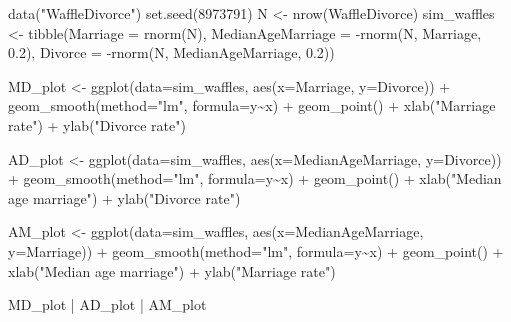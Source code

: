 \documentclass[
]{book}
\newenvironment{Shaded}{\begin{snugshade}}{\end{snugshade}}
\newcommand{\AttributeTok}[1]{\textcolor[rgb]{0.77,0.63,0.00}{#1}}
\newcommand{\DecValTok}[1]{\textcolor[rgb]{0.00,0.00,0.81}{#1}}
\newcommand{\FloatTok}[1]{\textcolor[rgb]{0.00,0.00,0.81}{#1}}
\newcommand{\FunctionTok}[1]{\textcolor[rgb]{0.00,0.00,0.00}{#1}}
\newcommand{\NormalTok}[1]{#1}
\newcommand{\OtherTok}[1]{\textcolor[rgb]{0.56,0.35,0.01}{#1}}
\newcommand{\SpecialCharTok}[1]{\textcolor[rgb]{0.00,0.00,0.00}{#1}}
\newcommand{\StringTok}[1]{\textcolor[rgb]{0.31,0.60,0.02}{#1}}
\begin{document}
\begin{Shaded}
\begin{Highlighting}[]
\FunctionTok{data}\NormalTok{(}\StringTok{"WaffleDivorce"}\NormalTok{)}
\FunctionTok{set.seed}\NormalTok{(}\DecValTok{8973791}\NormalTok{)}
\NormalTok{N }\OtherTok{\textless{}{-}} \FunctionTok{nrow}\NormalTok{(WaffleDivorce)}
\NormalTok{sim\_waffles }\OtherTok{\textless{}{-}} \FunctionTok{tibble}\NormalTok{(}\AttributeTok{Marriage =} \FunctionTok{rnorm}\NormalTok{(N),}
                      \AttributeTok{MedianAgeMarriage =} \SpecialCharTok{{-}}\FunctionTok{rnorm}\NormalTok{(N, Marriage, }\FloatTok{0.2}\NormalTok{),}
                      \AttributeTok{Divorce =} \SpecialCharTok{{-}}\FunctionTok{rnorm}\NormalTok{(N, MedianAgeMarriage, }\FloatTok{0.2}\NormalTok{))}

\NormalTok{MD\_plot }\OtherTok{\textless{}{-}} 
  \FunctionTok{ggplot}\NormalTok{(}\AttributeTok{data=}\NormalTok{sim\_waffles, }\FunctionTok{aes}\NormalTok{(}\AttributeTok{x=}\NormalTok{Marriage, }\AttributeTok{y=}\NormalTok{Divorce)) }\SpecialCharTok{+} 
  \FunctionTok{geom\_smooth}\NormalTok{(}\AttributeTok{method=}\StringTok{"lm"}\NormalTok{, }\AttributeTok{formula=}\NormalTok{y}\SpecialCharTok{\textasciitilde{}}\NormalTok{x) }\SpecialCharTok{+} 
  \FunctionTok{geom\_point}\NormalTok{() }\SpecialCharTok{+} 
  \FunctionTok{xlab}\NormalTok{(}\StringTok{"Marriage rate"}\NormalTok{) }\SpecialCharTok{+} 
  \FunctionTok{ylab}\NormalTok{(}\StringTok{"Divorce rate"}\NormalTok{)}

\NormalTok{AD\_plot }\OtherTok{\textless{}{-}} 
  \FunctionTok{ggplot}\NormalTok{(}\AttributeTok{data=}\NormalTok{sim\_waffles, }\FunctionTok{aes}\NormalTok{(}\AttributeTok{x=}\NormalTok{MedianAgeMarriage, }\AttributeTok{y=}\NormalTok{Divorce)) }\SpecialCharTok{+} 
  \FunctionTok{geom\_smooth}\NormalTok{(}\AttributeTok{method=}\StringTok{"lm"}\NormalTok{, }\AttributeTok{formula=}\NormalTok{y}\SpecialCharTok{\textasciitilde{}}\NormalTok{x) }\SpecialCharTok{+} 
  \FunctionTok{geom\_point}\NormalTok{() }\SpecialCharTok{+} 
  \FunctionTok{xlab}\NormalTok{(}\StringTok{"Median age marriage"}\NormalTok{) }\SpecialCharTok{+} 
  \FunctionTok{ylab}\NormalTok{(}\StringTok{"Divorce rate"}\NormalTok{)}

\NormalTok{AM\_plot }\OtherTok{\textless{}{-}} 
  \FunctionTok{ggplot}\NormalTok{(}\AttributeTok{data=}\NormalTok{sim\_waffles, }\FunctionTok{aes}\NormalTok{(}\AttributeTok{x=}\NormalTok{MedianAgeMarriage, }\AttributeTok{y=}\NormalTok{Marriage)) }\SpecialCharTok{+} 
  \FunctionTok{geom\_smooth}\NormalTok{(}\AttributeTok{method=}\StringTok{"lm"}\NormalTok{, }\AttributeTok{formula=}\NormalTok{y}\SpecialCharTok{\textasciitilde{}}\NormalTok{x) }\SpecialCharTok{+} 
  \FunctionTok{geom\_point}\NormalTok{() }\SpecialCharTok{+} 
  \FunctionTok{xlab}\NormalTok{(}\StringTok{"Median age marriage"}\NormalTok{) }\SpecialCharTok{+} 
  \FunctionTok{ylab}\NormalTok{(}\StringTok{"Marriage rate"}\NormalTok{)}

\NormalTok{MD\_plot }\SpecialCharTok{|}\NormalTok{ AD\_plot }\SpecialCharTok{|}\NormalTok{ AM\_plot}
\end{Highlighting}
\end{Shaded}
\end{document}
